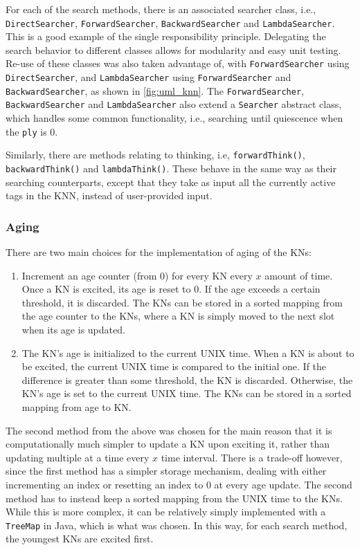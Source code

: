 \documentclass[titlepage,11pt]{article}
\newcommand{\code}[1]{\texttt{#1}}
\begin{document}
For each of the search methods, there is an associated searcher class, i.e., \code{DirectSearcher}, \code{ForwardSearcher}, \code{BackwardSearcher} and \code{LambdaSearcher}. This is a good example of the single responsibility principle. Delegating the search behavior to different classes allows for modularity and easy unit testing. Re-use of these classes was also taken advantage of, with \code{ForwardSearcher} using \code{DirectSearcher}, and \code{LambdaSearcher} using \code{ForwardSearcher} and \code{BackwardSearcher}, as shown in \cref{fig:uml_knn}. The \code{ForwardSearcher}, \code{BackwardSearcher} and \code{LambdaSearcher} also extend a \code{Searcher} abstract class, which handles some common functionality, i.e., searching until quiescence when the \code{ply} is 0.

Similarly, there are methods relating to thinking, i.e, \code{forwardThink()}, \code{backwardThink()} and \code{lambdaThink()}. These behave in the same way as their searching counterparts, except that they take as input all the currently active tags in the KNN, instead of user-provided input.

\subsubsection{Aging}

There are two main choices for the implementation of aging of the KNs:

\begin{enumerate}
	\item Increment an age counter (from 0) for every KN every $x$ amount of time. Once a KN is excited, its age is reset to 0. If the age exceeds a certain threshold, it is discarded. The KNs can be stored in a sorted mapping from the age counter to the KNs, where a KN is simply moved to the next slot when its age is updated.
	\item The KN's age is initialized to the current UNIX time. When a KN is about to be excited, the current UNIX time is compared to the initial one. If the difference is greater than some threshold, the KN is discarded. Otherwise, the KN's age is set to the current UNIX time. The KNs can be stored in a sorted mapping from age to KN.
\end{enumerate}

The second method from the above was chosen for the main reason that it is computationally much simpler to update a KN upon exciting it, rather than updating multiple at a time every $x$ time interval. There is a trade-off however, since the first method has a simpler storage mechanism, dealing with either incrementing an index or resetting an index to 0 at every age update. The second method has to instead keep a sorted mapping from the UNIX time to the KNs. While this is more complex, it can be relatively simply implemented with a \code{TreeMap} in Java, which is what was chosen. In this way, for each search method, the youngest KNs are excited first.
\end{document}

